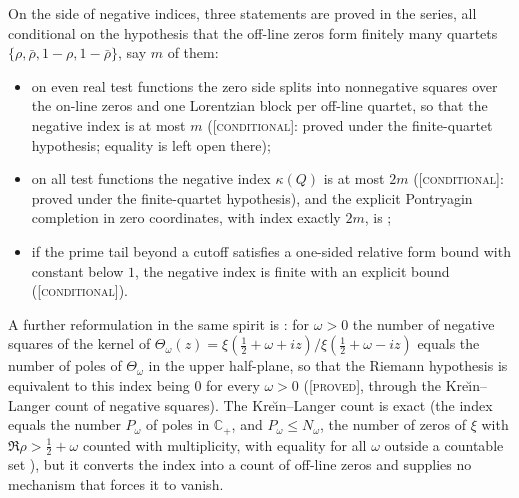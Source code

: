 \documentclass[11pt]{amsart}
\theoremstyle{definition}
\theoremstyle{remark}
\numberwithin{equation}{section}
\newcommand{\C}{\mathbb{C}}
\newcommand{\stag}[1]{\textsc{[#1]}}
\newcommand{\PROVED}{\stag{proved}}
\newcommand{\COND}{\stag{conditional}}
\begin{document}
On the side of negative indices, three statements are proved in the series, all conditional on
the hypothesis that the off-line zeros form finitely many quartets $\{\rho,\bar\rho,1-\rho,1-\bar\rho\}$,
say $m$ of them:
\begin{itemize}[leftmargin=2em]
\item on even real test functions the zero side splits into nonnegative squares over the on-line
  zeros and one Lorentzian block per off-line quartet, so that the negative index is at most $m$
  \cite[Theorem~3.1 and Corollary~6.5]{P18} (\COND: proved under the finite-quartet hypothesis;
  equality is left open there);
\item on all test functions the negative index $\kappa(Q)$ is at most $2m$ \cite[Lemma~4.6]{P25}
  (\COND: proved under the finite-quartet hypothesis), and the explicit Pontryagin completion in zero
  coordinates, with index exactly $2m$, is \cite[Proposition~4.7]{P25};
\item if the prime tail beyond a cutoff satisfies a one-sided relative form bound with constant
  below $1$, the negative index is finite with an explicit bound \cite[Proposition~2.1]{P11} (\COND).
\end{itemize}
A further reformulation in the same spirit is \cite[Theorem~4.1 and Corollary~4.2]{P35}: for
$\omega>0$ the number of negative squares of the kernel of
$\Theta_\omega(z)=\xi(\frac12+\omega+iz)/\xi(\frac12+\omega-iz)$ equals the number of poles of
$\Theta_\omega$ in the upper half-plane, so that the Riemann hypothesis is equivalent to this index
being $0$ for every $\omega>0$ (\PROVED, through the Kre\u{\i}n--Langer count of negative squares).
The Kre\u{\i}n--Langer count is exact (the index equals the number $P_\omega$ of poles in $\C_+$, and
$P_\omega\le N_\omega$, the number of zeros of $\xi$ with $\Re\rho>\frac12+\omega$ counted with multiplicity, with equality for all $\omega$ outside a countable set \cite[Theorem~4.1]{P35}), but
it converts the index into a count of off-line zeros and supplies no mechanism that forces it to vanish.
\end{document}
